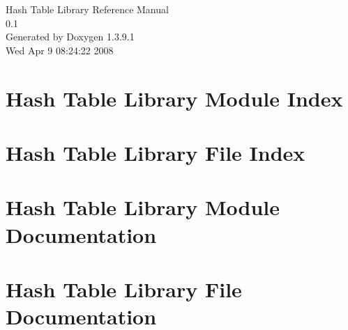 \documentclass[a4paper]{book}
\begin{document}
\begin{titlepage}
\vspace*{7cm}
\begin{center}
{\Large Hash Table Library Reference Manual\\[1ex]\large 0.1 }\\
\vspace*{1cm}
{\large Generated by Doxygen 1.3.9.1}\\
\vspace*{0.5cm}
{\small Wed Apr 9 08:24:22 2008}\\
\end{center}
\end{titlepage}
\clearemptydoublepage
{}
\tableofcontents
\clearemptydoublepage
{}
\chapter{Hash Table Library Module Index}

\chapter{Hash Table Library File Index}

\chapter{Hash Table Library Module Documentation}


\chapter{Hash Table Library File Documentation}




\printindex
\end{document}
